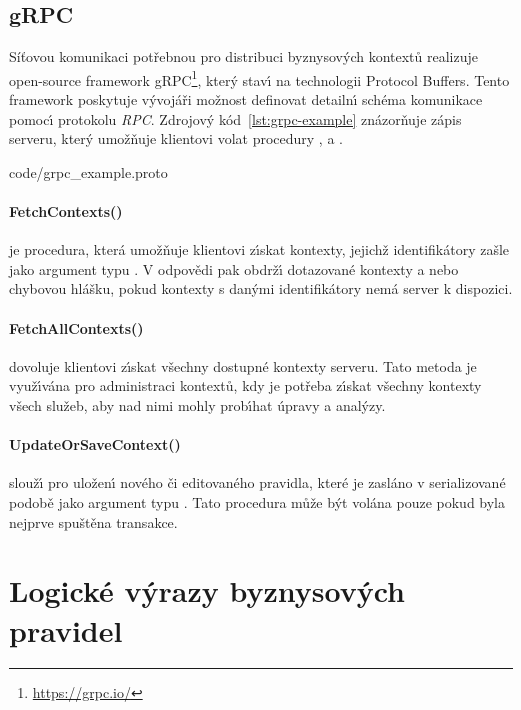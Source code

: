 \subsection{gRPC}

Síťovou komunikaci potřebnou pro distribuci byznysových kontextů realizuje
open-source framework gRPC\footnote{\url{https://grpc.io/}}, kter\'y stav\'{\i}
na technologii Protocol Buffers. Tento framework poskytuje v\'yvojáři
možnost definovat detailn\'{\i} schéma komunikace pomoc\'{\i} protokolu \textit{\gls{RPC}}.
Zdrojov\'y kód~\ref{lst:grpc-example} znázorňuje zápis serveru,
kter\'y umožňuje klientovi volat procedury ,
 a .


{code/grpc_example.proto}

\paragraph{FetchContexts()} je procedura, která umožňuje klientovi
z\'{\i}skat kontexty, jejichž identifikátory zašle jako argument
typu .
V odpovědi pak obdrž\'{\i} dotazované kontexty a nebo chybovou hlášku,
pokud kontexty s dan\'ymi identifikátory nemá server k dispozici.

\paragraph{FetchAllContexts()} dovoluje klientovi z\'{\i}skat všechny
dostupné kontexty serveru. Tato metoda je využ\'{\i}vána pro administraci
kontextů, kdy je potřeba z\'{\i}skat všechny kontexty všech služeb, aby
nad nimi mohly prob\'{\i}hat úpravy a anal\'yzy.

\paragraph{UpdateOrSaveContext()} slouž\'{\i} pro uložen\'{\i} nového či
editovaného pravidla, které je zasláno v serializované podobě
jako argument typu .
Tato procedura může být volána pouze pokud byla nejprve spuštěna transakce.

\section{Logické výrazy byznysových pravidel}

